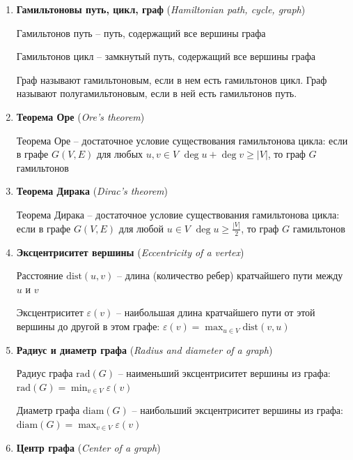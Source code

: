 \documentclass[12pt]{article}
\begin{document}
\begin{enumerate}
        Граф полуэйлеров, если ровно 2 вершины имеют нечетную степень, а ребра принадлежат одной компоненте связности

        \item \textbf{Гамильтоновы путь, цикл, граф} (\textit{Hamiltonian path, cycle, graph})

        Гамильтонов путь -- путь, содержащий все вершины графа

        Гамильтонов цикл -- замкнутый путь, содержащий все вершины графа

        Граф называют гамильтоновым, если в нем есть гамильтонов цикл. Граф называют полугамильтоновым, если в ней есть гамильтонов путь.

        \item \textbf{Теорема Оре} (\textit{Ore’s theorem})

        Теорема Оре -- достаточное условие существования гамильтонова цикла: если в графе $G(V, E)$ для любых $u, v \in V$ $\deg u + \deg v \geq |V|$, то граф $G$ гамильтонов

        \item \textbf{Теорема Дирака} (\textit{Dirac’s theorem})

        Теорема Дирака -- достаточное условие существования гамильтонова цикла: если в графе $G(V, E)$ для любой $u \in V$ $\deg u \geq \frac{|V|}{2}$, то граф $G$ гамильтонов


        \item \textbf{Эксцентриситет вершины} (\textit{Eccentricity of a vertex})

        Расстояние $\text{dist}(u, v)$ -- длина (количество ребер) кратчайшего пути между $u$ и $v$

        Эксцентриситет $\varepsilon(v)$ -- наибольшая длина кратчайшего пути от этой вершины до другой в этом графе: $\varepsilon(v) = \max_{u \in V} \text{dist}(v, u)$

        \item \textbf{Радиус и диаметр графа} (\textit{Radius and diameter of a graph})

        Радиус графа $\text{rad}(G)$ -- наименьший эксцентриситет вершины из графа: $\text{rad}(G) = \min_{v \in V} \varepsilon(v)$

        Диаметр графа $\text{diam}(G)$ -- наибольший эксцентриситет вершины из графа: $\text{diam}(G) = \max_{v \in V} \varepsilon(v)$

        \item \textbf{Центр графа} (\textit{Center of a graph})


\end{enumerate}
\end{document}
